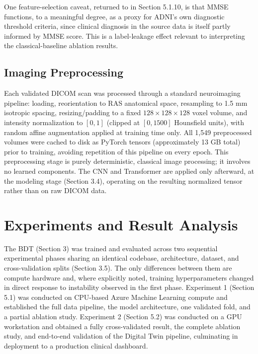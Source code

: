 \documentclass[pdflatex,sn-mathphys-num]{sn-jnl}%
\theoremstyle{thmstyleone}%
\theoremstyle{thmstyletwo}%
\theoremstyle{thmstylethree}%
\begin{document}
One feature-selection caveat, returned to in Section 5.1.10, is that MMSE functions, to a meaningful degree, as a proxy for ADNI's own diagnostic threshold criteria, since clinical diagnosis in the source data is itself partly informed by MMSE score. This is a label-leakage effect relevant to interpreting the classical-baseline ablation results.

\subsection{Imaging Preprocessing}\label{sec4_3}

Each validated DICOM scan was processed through a standard neuroimaging pipeline: loading, reorientation to RAS anatomical space, resampling to 1.5 mm isotropic spacing, resizing/padding to a fixed $128 \times 128 \times 128$ voxel volume, and intensity normalization to $[0,1]$ (clipped at $[0, 1500]$ Hounsfield units), with random affine augmentation applied at training time only. All 1,549 preprocessed volumes were cached to disk as PyTorch tensors (approximately 13 GB total) prior to training, avoiding repetition of this pipeline on every epoch. This preprocessing stage is purely deterministic, classical image processing; it involves no learned components. The CNN and Transformer are applied only afterward, at the modeling stage (Section 3.4), operating on the resulting normalized tensor rather than on raw DICOM data.


\FloatBarrier
\section{Experiments and Result Analysis}\label{sec5}

The BDT (Section 3) was trained and evaluated across two sequential experimental phases sharing an identical codebase, architecture, dataset, and cross-validation splits (Section 3.5). The only differences between them are compute hardware and, where explicitly noted, training hyperparameters changed in direct response to instability observed in the first phase. Experiment 1 (Section 5.1) was conducted on CPU-based Azure Machine Learning compute and established the full data pipeline, the model architecture, one validated fold, and a partial ablation study. Experiment 2 (Section 5.2) was conducted on a GPU workstation and obtained a fully cross-validated result, the complete ablation study, and end-to-end validation of the Digital Twin pipeline, culminating in deployment to a production clinical dashboard.
\end{document}
